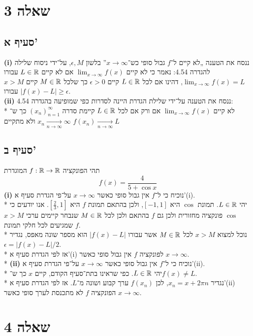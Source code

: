 \section{שאלה 3}
\subsection{סעיף א'}
\textbf{(i)}
ננסח את הטענה „לא קיים ל־$f$ גבול סופי כש־$x \to \infty$”
בלשון $\epsilon, M$, על־ידי ניסוח שלילה להגדרה 4.54:
נאמר כי לא קיים $\lim_{x \to \infty} f(x)$
אם לא קיים $L \in \mathbb{R}$ עבורו $\lim_{x \to \infty} f(x) = L$,
דהינו אם לכל $L \in \mathbb{R}$ קיים $\epsilon > 0$ כך שלכל $M \in \mathbb{R}$
קיים $x > M$ עבורו $\left| f(x) - L\right| \ge \epsilon$. \\
\textbf{(ii)}
ננסח את הטענה על־ידי שלילת הגדרת היינה לסדרות כפי שמופיעה בהגדרה 4.54: \\*
לא קיים $\lim_{x \to \infty}f(x)$ אם ורק אם
לכל $L \in \mathbb{R}$
קיימת סדרה ${(x_n)}_{n = 1}^\infty$
כך ש־$x_n \underset{n \to \infty}{\rightarrow} \infty$
ולא מתקיים $f(x_n) \underset{n \to \infty}{\rightarrow} L$

\subsection{סעיף ב'}
תהי הפונקציה $f: \mathbb{R} \to \mathbb{R}$ המוגדרת
\[
	f(x) = \frac{4}{5 + \cos x}
\]
\textbf{(i)}
נוכיח כי ל־$f$ אין גבול סופי כאשר $x \to \infty$ על־פי הגדרת סעיף א'(i). \\*
יהי $L \in \mathbb{R}$.
תמונת $\cos$ היא $[-1, 1]$, ולכן בהתאם תמונת $f$ היא $[\frac{2}{3}, 1]$.
אנו יודעים כי $\cos$ פונקציה מחזורית ולכן גם $f$ בהתאם ולכן לכל $M \in \mathbb{R}$ שנבחר קיימים ערכי $x > M$ שמגיעים לכל חלקי תמונת $f$. \\*
נוכל למצוא $x > M$ לכל $M \in \mathbb{R}$ אשר עבורו $|f(x) - L|$ הוא מספר שונה מאפס, נגדיר $\epsilon = |f(x) - L|/2$. \\*
אז לפי הגדרת סעיף א'(i) לפונקציה $f$ אין גבול סופי כאשר $x \to \infty$. \\*
\textbf{(ii)}
נוכיח כי ל־$f$ אין גבול סופי כאשר $x \to \infty$ על־פי הגדרת סעיף א'(ii). \\*
יהי $L \in \mathbb{R}$. כפי שראינו בתת־סעיף הקודם, קיים $x$ כך ש־$f(x) \ne L$. \\*
נגדיר $x_n = x + 2 \pi n$, לכן $f(x_n)$ ערך קבוע ושונה מ־$L$.
אז לפי הגדרת סעיף א'(ii) הפונקציה $f$ לא מתכנסת לערך סופי כאשר $x \to \infty$.

\section{שאלה 4}

